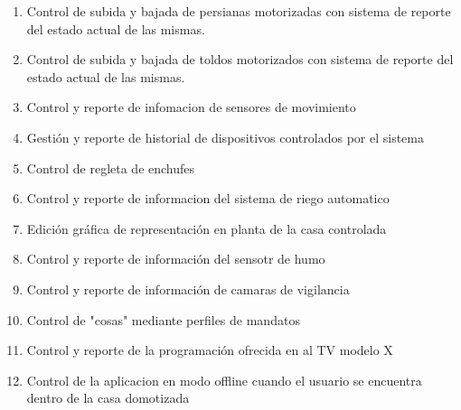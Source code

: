 \begin{enumerate}
			\item Control de subida y bajada de persianas motorizadas con sistema de reporte del estado actual de las mismas. 
			
			\item Control de subida y bajada de toldos motorizados con sistema de reporte del estado actual de las mismas. 
			
			\item Control  y reporte de infomacion de sensores de movimiento
			
			\item Gesti\'on y reporte de historial de dispositivos controlados por el sistema
			
			\item Control de regleta  de enchufes
			
			\item Control y reporte de informacion del sistema de riego automatico
			
			\item Edici\'on gr\'afica de representaci\'on en planta de la casa controlada
			
			\item Control y reporte de informaci\'on del sensotr de humo
			
			\item Control y reporte de informaci\'on de camaras de vigilancia
			
			\item Control de "cosas" mediante perfiles de mandatos
			
			\item Control y reporte de la programaci\'on ofrecida en al TV modelo X
			
			\item Control de la aplicacion en modo offline cuando el usuario se encuentra dentro de la casa domotizada
	
	\end{enumerate}
	